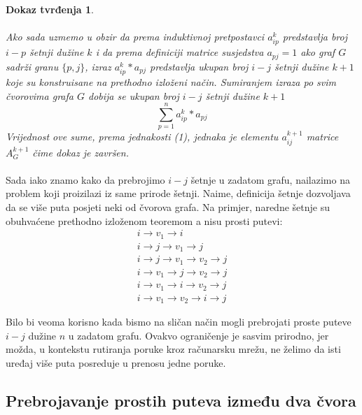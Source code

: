 \documentclass[11pt]{article}
\newtheorem*{custom_proof}{Dokaz tvrđenja}
\begin{document}
\begin{custom_proof}
			\paragraph{}
			Ako sada uzmemo u obzir da prema induktivnoj pretpostavci $a_{ip}^k$ predstavlja broj $i-p$ šetnji dužine $k$ i da prema definiciji matrice susjedstva $a_{pj}=1$ ako graf $G$ sadrži granu $\{p,j\}$, 
			izraz $a_{ip}^k * a_{pj}$ predstavlja ukupan broj $i-j$ šetnji dužine $k+1$ koje su konstruisane na prethodno izloženi način. 
			Sumiranjem izraza po svim čvorovima grafa $G$ dobija se ukupan broj $i-j$ šetnji dužine $k+1$ 
			\[ \sum_{p=1}^{n} a_{ip}^k * a_{pj} \]
			Vrijednost ove sume, prema jednakosti (1), jednaka je elementu $a_{ij}^{k+1}$ matrice $A_G^{k+1}$ čime dokaz je završen.
		\end{custom_proof}
	
		\paragraph{}
		Sada iako znamo kako da prebrojimo $i-j$ šetnje u zadatom grafu, nailazimo na problem koji proizilazi iz same prirode šetnji. Naime, definicija šetnje dozvoljava da se više puta posjeti neki od čvorova grafa.
		Na primjer, naredne šetnje su obuhvaćene prethodno izloženom teoremom a nisu prosti putevi:
		\[
			\begin{split}
			i \rightarrow v_1 \rightarrow i \\
			i \rightarrow  j \rightarrow v_1 \rightarrow j \\
			i \rightarrow j \rightarrow v_1 \rightarrow v_2 \rightarrow j \\
			i \rightarrow v_1 \rightarrow j \rightarrow v_2 \rightarrow j \\
			i \rightarrow v_1 \rightarrow i \rightarrow v_2 \rightarrow j \\
			i \rightarrow v_1 \rightarrow v_2 \rightarrow i \rightarrow j 
			\end{split}
		\]

		Bilo bi veoma korisno kada bismo na sličan način mogli prebrojati proste puteve $i-j$ dužine $n$ u zadatom grafu. 
		Ovakvo ograničenje je sasvim prirodno, jer možda, u kontekstu rutiranja poruke kroz računarsku mrežu,
		ne želimo da isti uređaj više puta posreduje u prenosu jedne poruke. 
		
		\subsection{Prebrojavanje prostih puteva između dva čvora}
\end{document}
